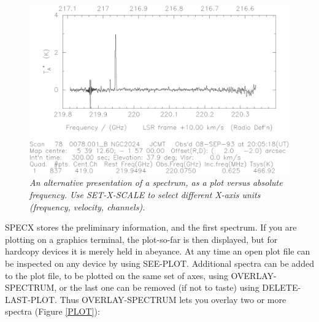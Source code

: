 \documentclass[11pt,twoside]{report}
\begin{document}
\begin{figure}[htbp]
\begin{center}
\includegraphics[scale=0.65]{image.ps}
\protect\parbox{5.5in}
{\caption[IMAGE]
{\sl
An alternative presentation of a spectrum, as a plot versus absolute
frequency. Use SET-X-SCALE to select different X-axis units (frequency,
velocity, channels).
\label{IMAGE}
}
}
\end{center}
\end{figure}
SPECX stores the preliminary information, and the
first spectrum. If you are plotting on a graphics terminal, the plot-so-far is
then displayed, but for hardcopy devices it is merely held in abeyance. At any
time an open plot file can be inspected on any device by using SEE-PLOT.
Additional spectra can be added to the plot file, to be plotted on the same set
of axes, using OVERLAY-SPECTRUM, or the last one can be removed (if not to taste)
using DELETE-LAST-PLOT. Thus OVERLAY-SPECTRUM lets you overlay two or more
spectra (Figure \ref{PLOT}):
\end{document}
